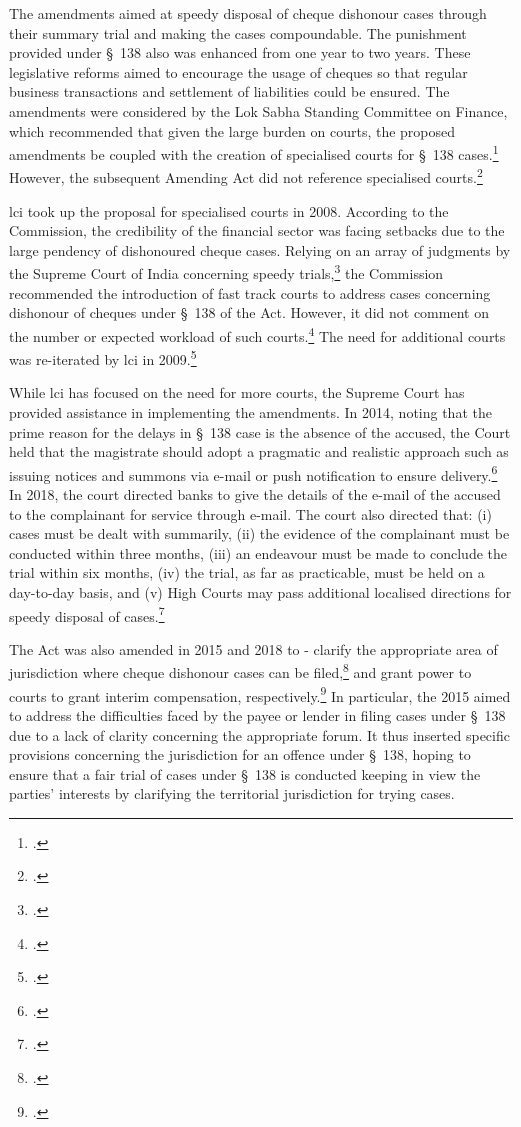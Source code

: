 \begin{enumerate}
\begin{enumerate}
The amendments aimed at speedy disposal of cheque dishonour cases through their summary trial and making the cases compoundable. The punishment provided under \S~138 also was enhanced from one year to two years. These legislative
reforms aimed to encourage the usage of cheques so that regular business transactions and settlement of liabilities could be ensured. The amendments were considered by the Lok Sabha Standing Committee on Finance, which recommended that given the large burden on courts, the proposed amendments be coupled with the creation of specialised courts for \S~138 cases.\footcite{stdcomm2001_138niAct} However, the subsequent Amending Act did not reference specialised courts.\footcite{niAmend2002} 

\gls{lci} took up the proposal for specialised courts in 2008. According to the Commission, the credibility of the financial sector was facing setbacks due to the large pendency of dishonoured cheque cases. Relying on an array of judgments by the Supreme Court of India concerning speedy trials,\footcite{sc1978_khatoon, sc1981_champalal, sc2005_surinder, sc2008_krishna} the Commission recommended the introduction of fast track courts to address cases concerning dishonour of cheques under \S~138 of the Act. However, it did not comment on the number or expected workload of such courts.\footcite{lci2008_138} The need for additional courts was re-iterated by \gls{lci} in 2009.\footcite{lci2009_reforms}

While \gls{lci} has focused on the need for more courts, the Supreme Court has provided assistance in implementing the amendments. In 2014, noting that the prime reason for the delays in \S~138 case is the absence of the accused, the Court held that the magistrate should adopt a pragmatic and realistic approach such as issuing notices and summons via e-mail or push notification to ensure delivery.\footcite{sc2014_iba} In 2018, the court directed banks to give the details of the e-mail of the accused to the complainant for service through e-mail. The court also directed that: (i) cases must be dealt with summarily, (ii) the evidence of the complainant must be conducted within three months, (iii) an endeavour must be made to conclude the trial within six months, (iv) the trial, as far as practicable, must be held on a day-to-day basis, and (v) High Courts may pass additional localised directions for speedy disposal of cases.\footcite{sc2018_meters}

The Act was also amended in 2015 and 2018 to - clarify the appropriate area of jurisdiction where cheque dishonour cases can be filed,\footcite{niAmend2015} and grant power to courts to grant interim compensation, respectively.\footcite{niAmend2018} In particular, the  2015 aimed to address the difficulties faced by the payee or lender in filing cases under \S~138 due to a lack of clarity concerning the appropriate forum. It thus inserted specific provisions concerning the jurisdiction for an offence under \S~138, hoping to ensure that a fair trial of cases under \S~138 is conducted keeping in view the parties' interests by clarifying the territorial jurisdiction for trying cases.


\end{enumerate}
\end{enumerate}
